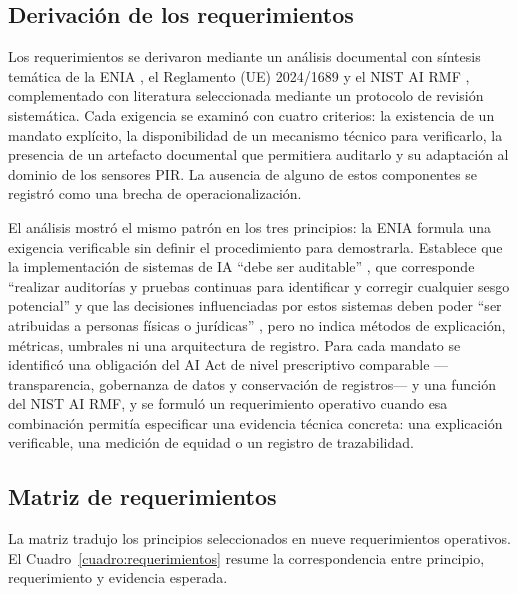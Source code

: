 \subsection{Derivación de los requerimientos}

Los requerimientos se derivaron mediante un análisis documental con síntesis
temática de la ENIA \cite{micitt2024enia}, el Reglamento (UE) 2024/1689
\cite{ue2024aiact} y el NIST AI RMF \cite{nist2023airmf}, complementado con
literatura seleccionada mediante un protocolo de revisión sistemática. Cada
exigencia se examinó con cuatro criterios: la existencia de un mandato
explícito, la disponibilidad de un mecanismo técnico para verificarlo, la
presencia de un artefacto documental que permitiera auditarlo y su adaptación
al dominio de los sensores PIR. La ausencia de alguno de estos componentes se
registró como una brecha de operacionalización.

El análisis mostró el mismo patrón en los tres principios: la ENIA formula una
exigencia verificable sin definir el procedimiento para demostrarla. Establece
que la implementación de sistemas de IA \enquote{debe ser auditable}
\cite[p.~32]{micitt2024enia}, que corresponde \enquote{realizar auditorías y
pruebas continuas para identificar y corregir cualquier sesgo potencial}
\cite[p.~33]{micitt2024enia} y que las decisiones influenciadas por estos
sistemas deben poder \enquote{ser atribuidas a personas físicas o jurídicas}
\cite[p.~33]{micitt2024enia}, pero no indica métodos de explicación, métricas,
umbrales ni una arquitectura de registro. Para cada mandato se identificó una
obligación del AI Act de nivel prescriptivo comparable ---transparencia,
gobernanza de datos y conservación de registros--- y una función del NIST AI RMF, y
se formuló un requerimiento operativo cuando esa combinación permitía
especificar una evidencia técnica concreta: una explicación verificable, una
medición de equidad o un registro de trazabilidad.

\subsection{Matriz de requerimientos}

La matriz tradujo los principios seleccionados en nueve requerimientos
operativos. El Cuadro~\ref{cuadro:requerimientos} resume la correspondencia
entre principio, requerimiento y evidencia esperada.


